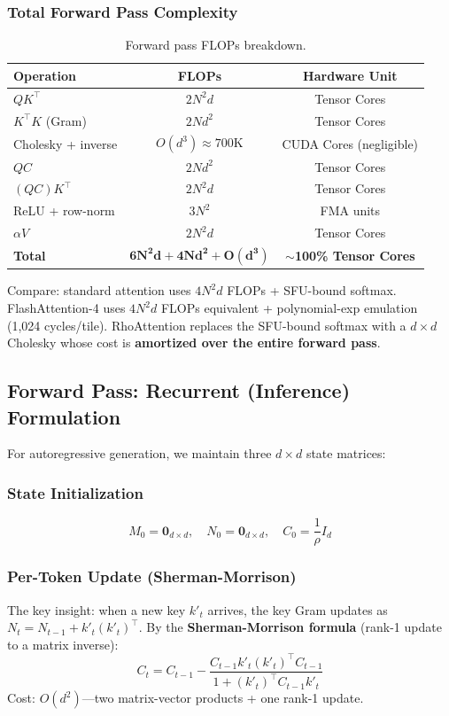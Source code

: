 \documentclass[11pt,a4paper]{article}
\theoremstyle{remark}
\begin{document}
\subsubsection{Total Forward Pass Complexity}
\begin{table}[h]
\centering
\caption{Forward pass FLOPs breakdown.}
\begin{tabular}{lcc}
\toprule
\textbf{Operation} & \textbf{FLOPs} & \textbf{Hardware Unit} \\
\midrule
$QK^\top$ & $2N^2 d$ & Tensor Cores \\
$K^\top K$ (Gram) & $2Nd^2$ & Tensor Cores \\
Cholesky + inverse & $O(d^3) \approx 700\text{K}$ & CUDA Cores (negligible) \\
$Q C$ & $2Nd^2$ & Tensor Cores \\
$(QC)K^\top$ & $2N^2 d$ & Tensor Cores \\
ReLU + row-norm & $3N^2$ & FMA units \\
$\alpha V$ & $2N^2 d$ & Tensor Cores \\
\midrule
\textbf{Total} & $\mathbf{6N^2 d + 4Nd^2 + O(d^3)}$ & $\mathbf{\sim}$\textbf{100\% Tensor Cores} \\
\bottomrule
\end{tabular}
\end{table}

Compare: standard attention uses $4N^2 d$ FLOPs + SFU-bound softmax. FlashAttention-4 uses $4N^2 d$ FLOPs equivalent + polynomial-exp emulation (1,024 cycles/tile). RhoAttention replaces the SFU-bound softmax with a $d \times d$ Cholesky whose cost is \textbf{amortized over the entire forward pass}.

\subsection{Forward Pass: Recurrent (Inference) Formulation}

For autoregressive generation, we maintain three $d \times d$ state matrices:

\subsubsection{State Initialization}
\begin{equation}
M_0 = \mathbf{0}_{d \times d}, \quad N_0 = \mathbf{0}_{d \times d}, \quad C_0 = \frac{1}{\rho} I_d
\end{equation}

\subsubsection{Per-Token Update (Sherman-Morrison)}
The key insight: when a new key $k'_t$ arrives, the key Gram updates as $N_t = N_{t-1} + k'_t (k'_t)^\top$. By the \textbf{Sherman-Morrison formula} (rank-1 update to a matrix inverse):
\begin{equation}
\boxed{C_t = C_{t-1} - \frac{C_{t-1} k'_t (k'_t)^\top C_{t-1}}{1 + (k'_t)^\top C_{t-1} k'_t}}
\label{eq:sherman}
\end{equation}
Cost: $O(d^2)$---two matrix-vector products + one rank-1 update.
\end{document}
